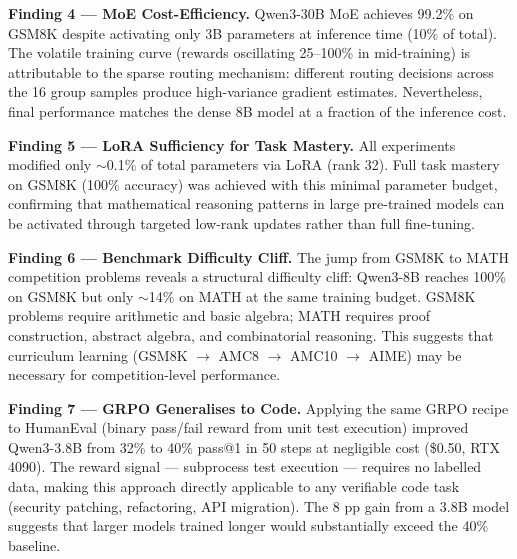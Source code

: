 \documentclass[12pt,a4paper]{report}
\theoremstyle{definition}
\begin{document}
\textbf{Finding 4 --- MoE Cost-Efficiency.}
Qwen3-30B MoE achieves 99.2\% on GSM8K despite activating only 3B parameters at inference time (10\% of total). The volatile training curve (rewards oscillating 25--100\% in mid-training) is attributable to the sparse routing mechanism: different routing decisions across the 16 group samples produce high-variance gradient estimates. Nevertheless, final performance matches the dense 8B model at a fraction of the inference cost.

\textbf{Finding 5 --- LoRA Sufficiency for Task Mastery.}
All experiments modified only $\sim$0.1\% of total parameters via LoRA (rank 32). Full task mastery on GSM8K (100\% accuracy) was achieved with this minimal parameter budget, confirming that mathematical reasoning patterns in large pre-trained models can be activated through targeted low-rank updates rather than full fine-tuning.

\textbf{Finding 6 --- Benchmark Difficulty Cliff.}
The jump from GSM8K to MATH competition problems reveals a structural difficulty cliff: Qwen3-8B reaches 100\% on GSM8K but only $\sim$14\% on MATH at the same training budget. GSM8K problems require arithmetic and basic algebra; MATH requires proof construction, abstract algebra, and combinatorial reasoning. This suggests that curriculum learning (GSM8K $\rightarrow$ AMC8 $\rightarrow$ AMC10 $\rightarrow$ AIME) may be necessary for competition-level performance.

\textbf{Finding 7 --- GRPO Generalises to Code.}
Applying the same GRPO recipe to HumanEval (binary pass/fail reward from unit test execution) improved Qwen3-3.8B from 32\% to 40\% pass@1 in 50 steps at negligible cost (\$0.50, RTX 4090). The reward signal --- subprocess test execution --- requires no labelled data, making this approach directly applicable to any verifiable code task (security patching, refactoring, API migration). The 8 pp gain from a 3.8B model suggests that larger models trained longer would substantially exceed the 40\% baseline.
\end{document}
